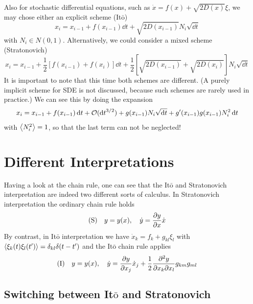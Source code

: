 \documentclass{notebook}
\begin{document}
Also for stochastic differential equations, such as $\dot{x} = f(x) + \sqrt{2 D(x)} \xi$, we may chose either an explicit scheme (It$\bar{\mathrm{o}}$) 
%
\begin{equation}
x_i = x_{i-1} + f(x_{i-1}) \dd{t} + \sqrt{2 D(x_{i-1})} N_i \sqrt{\dd{t}}
\end{equation}
%
with $N_i \in N(0,1)$. Alternatively, we could consider a mixed scheme (Stratonovich)
%
\begin{equation}
x_i = x_{i-1} + \frac{1}{2} [f(x_{i-1}) + f(x_i)] \dd{t} + \frac{1}{2} [\sqrt{2 D(x_{i-1})} + \sqrt{2 D(x_i)}] N_i \sqrt{\dd{t}}
\end{equation}
%
It is important to note that this time both schemes are different. (A purely implicit scheme for SDE is not discussed, because such schemes are rarely used in practice.) We can see this by doing the expansion
%
\begin{equation}
x_i = x_{i-1} + f(x_{i-1}) \dd{t} + \mathcal{O}(\dd{t}^{3/2}) + g(x_{i-1}) N_i \sqrt{\dd{t}} + g'(x_{i-1}) g(x_{i-1}) N_i^2 \dd{t}
\end{equation}
%
with $\expval{N_i^2} = 1$, so that the last term can not be neglected!

\section{Different Interpretations}

Having a look at the chain rule, one can see that the It$\bar{\mathrm{o}}$ and Stratonovich interpretation are indeed two different sorts of calculus. In Stratonovich interpretation the ordinary chain rule holds
%
\begin{equation}
\mathrm{(S)} \quad y = y(x), \quad \dot{y} = \pdv{y}{x} \dot{x}
\end{equation}
%
By contrast, in It$\bar{\mathrm{o}}$ interpretation we have $\dot{x}_k = f_k + g_{kl} \xi_l$ with $\expval{\xi_k(t) \xi_l(t')} = \delta_{kl} \delta(t-t')$ and the It$\bar{\mathrm{o}}$ chain rule applies
%
\begin{equation}
\mathrm{(I)} \quad y = y(x), \quad \dot{y} = \pdv{y}{x_j} \dot{x}_j + \frac{1}{2} \pdv[2]{y}{x_k}{x_l} g_{km} g_{ml}
\end{equation}
%

\subsection*{Switching between It$\bar{\mathrm{o}}$ and Stratonovich}
\end{document}
